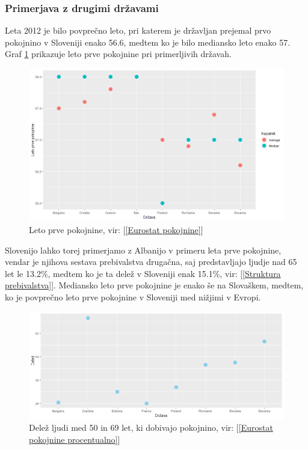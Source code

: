 \documentclass[12pt, a4paper]{article}
\begin{document}
\subsubsection[Primerjava z drugimi državami]{Primerjava z drugimi državami}
\hspace*{5mm} Leta 2012 je bilo povprečno leto, pri katerem je državljan prejemal prvo pokojnino v Sloveniji enako 56.6, medtem ko je bilo mediansko leto enako 57. Graf \ref{Slika 4} prikazuje leto prve pokojnine pri primerljivih državah.
\begin{figure}[h]
\centering
\includegraphics[height = 7 cm]{leto_prve_pokojnine.png}
\caption{Leto prve pokojnine, vir: [\ref{Eurostat pokojnine}]}
\label{Slika 4}
\end{figure}
Slovenijo lahko torej primerjamo z Albanijo v primeru leta prve pokojnine, vendar je njihova sestava prebivalstva drugačna, saj predstavljajo ljudje nad 65 let le 13.2\%, medtem ko je ta delež v Sloveniji enak 15.1\%, vir: [\ref{Struktura prebivalstva}]. Mediansko leto prve pokojnine je enako še na Slovaškem, medtem, ko je povprečno leto prve pokojnine v Sloveniji med nižjimi v Evropi.

\begin{figure}[h!]
\centering
\includegraphics[width = 13 cm]{graf_procentualno_pokojnina.png}
\caption{Delež ljudi med 50 in 69 let, ki dobivajo pokojnino, vir: [\ref{Eurostat pokojnine procentualno}]}
\label{Slika 5}
\end{figure}
\end{document}
